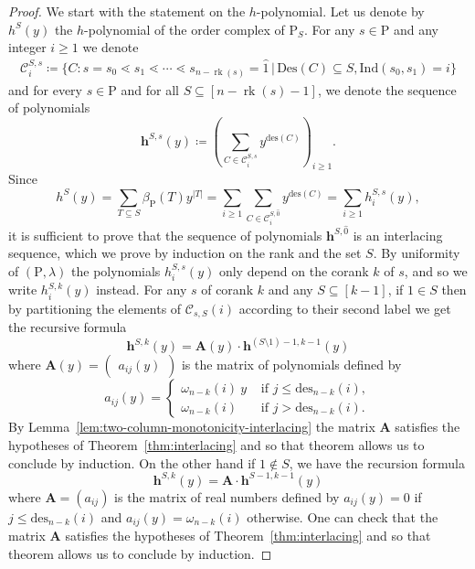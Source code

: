 \documentclass[11pt,a4paper]{amsart}
\theoremstyle{results}
\theoremstyle{definitions}
\def\P{\mathbb{P}}
\def\calC{\mathcal{C}}
\newcommand{\rk}{\operatorname{rk}}
\newcommand{\zero}{\hat{0}}
\newcommand{\des}{\mathrm{des}}
\newcommand{\un}{\hat{1}}
\newcommand{\Ind}{\mathrm{Ind}}
\newcommand{\Des}{\mathrm{Des}}
\renewcommand{\P}{\mathrm{P}}
\renewcommand{\hat}{\widehat}
\begin{document}
\begin{proof}
We start with the statement on the $h$-polynomial. Let us denote by $h^S(y)$ the $h$-polynomial of the order complex of $\P_S$. For any $s\in \P$ and any integer $i \geqslant1$ we denote 
\begin{align*}
    \calC^{S,s}_i \coloneqq \{ C \colon s = s_0 \lessdot s_1 \lessdot \cdots \lessdot s_{n - \rk(s)} = \un \,  | \, \Des(C) \subseteq S, \Ind(s_0, s_1) = i \}
\end{align*}
and for every $s \in \P$ and for all $S \subseteq [n - \rk(s) - 1]$, we denote the sequence of polynomials 
\[
\mathbf{h}^{S,s}(y) \coloneqq \left( \sum_{C \in \calC^{S,s}_i}y^{\des(C)}\right)_{i \geqslant 1}. 
\]
Since
\[
h^{S}(y) = \sum_{T \subseteq S} \beta_{\P}(T)y^{|T|} = \sum_{i \geqslant1} \sum_{C \in \calC^{S, \zero}_i}y^{\des(C)} = \sum_{i \geq 1}h^{S,s}_i(y),
\]
it is sufficient to prove that the sequence of polynomials $\mathbf{h}^{S, \zero}$ is an interlacing sequence, which we prove by induction on the rank and the set $S$. By uniformity of $(\P, \lambda)$ the polynomials $h_{i}^{S,s}(y)$ only depend on the corank $k$ of $s$, and so we write $h_{i}^{S,k}(y)$ instead. For any $s$ of corank $k$ and any $S \subseteq [k-1]$, if $1 \in S$ then by partitioning the elements of $\calC_{s, S}(i)$ according to their second label we get the recursive formula 
\begin{equation*}
    \mathbf{h}^{S, k}(y) = \mathbf{A} (y) \cdot \mathbf{h}^{(S\setminus 1)-1,k-1}(y)
\end{equation*}
where $\mathbf{A}(y) = \begin{pmatrix} a_{ij}(y)\end{pmatrix}$ is the matrix of polynomials defined by 
\[
a_{ij}(y) = \begin{cases}
\omega_{n-k}(i) \: y & \text{ if } j \leqslant \des_{n-k}(i), \\
\omega_{n-k}(i) & \text{ if } j > \des_{n-k}(i).
\end{cases}
\] By Lemma~\ref{lem:two-column-monotonicity-interlacing} the matrix $\mathbf{A}$ satisfies the hypotheses of Theorem~\ref{thm:interlacing} and so that theorem allows us to conclude by induction. On the other hand if $1 \notin S$, we have the recursion formula 
\begin{equation*}
    \mathbf{h}^{S,k}(y) = \mathbf{A} \cdot \mathbf{h}^{S-1, k-1}(y)
\end{equation*}
where $\mathbf{A} = (a_{ij})$ is the matrix of real numbers defined by $a_{ij}(y) = 0$ if $j \leqslant\des_{n-k}(i)$ and $a_{ij}(y) =\omega_{n-k}(i)$ otherwise. One can check that the matrix $\mathbf{A}$ satisfies the hypotheses of Theorem~\ref{thm:interlacing} and so that theorem allows us to conclude by induction.


\end{proof}
\end{document}
